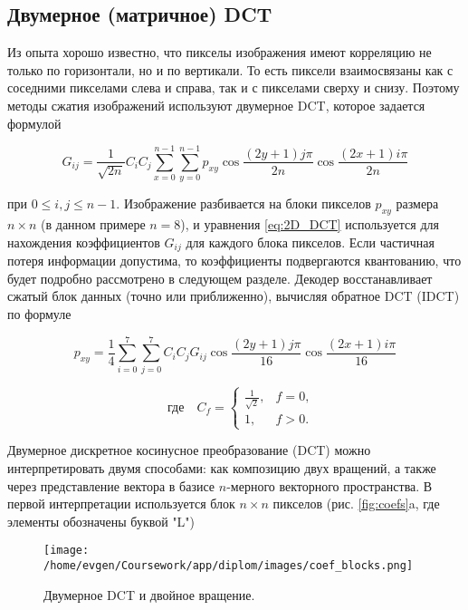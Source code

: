 \subsection{Двумерное (матричное) DCT}

Из опыта хорошо известно, что пикселы изображения имеют корреляцию  не только по горизонтали, но и по вертикали. 
То есть пиксели взаимосвязаны как с соседними пикселами слева и справа, так и с пикселами сверху и снизу. 
Поэтому методы сжатия изо­бражений используют двумерное DCT, которое задается формулой

\begin{equation}
    G_{ij} = \frac{1}{\sqrt{2n}} C_i C_j\sum_{x=0}^{n-1} \sum_{y=0}^{n-1} p_{xy} \cos{\frac{(2y+1)j \pi}{2n} \cos{\frac{(2x+1)i \pi}{2n}}}
    \label{eq:2D_DCT}
\end{equation}

при $0 \leq i, j \leq n - 1$. Изображение разбивается на блоки пикселов $p_{xy}$ размера $n \times n$ (в данном примере $n = 8$), 
и уравнения \eqref{eq:2D_DCT} используется для нахождения коэффициентов $G_{ij}$ для каждого блока пикселов.
Если частичная потеря информации допустима, то коэффициенты подвергаются квантованию, что будет подробно рассмотрено в следующем разделе. 
Декодер восстанавливает сжатый блок данных (точно или приближенно), вычисляя обратное DCT (IDCT) по формуле


\begin{equation}
    p_{xy} = \frac{1}{4} \sum_{i = 0}^{7} \sum_{j = 0}^{7} C_i C_j G_{ij} \cos{\frac{(2y+1)j \pi}{16} \cos{\frac{(2x+1)i \pi}{16}}}
    \label{eq:I2D_DCT}
\end{equation}

$$
\quad \text{где} \quad C_f = 
\left\{
    \begin{array}{ll}
        \frac{1}{\sqrt{2}}, & f = 0, \\
        1, & f > 0. 
    \end{array}
\right.
$$


Двумерное дискретное косинусное преобразование (DCT) можно интерпретировать двумя способами: как композицию двух вращений, 
а также через представление вектора в базисе $n$-мерного векторного пространства. 
В первой ин­терпретации используется блок $n \times n$ пикселов (рис. \eqref{fig:coefs}a, где элементы обозначены буквой "L")


\begin{figure}[h!]
    \centering
    \texttt{[image: /home/evgen/Coursework/app/diplom/images/coef\_blocks.png]}
    \caption{Двумерное DCT и двойное вращение.}
    \label{fig:coefs}
\end{figure}


